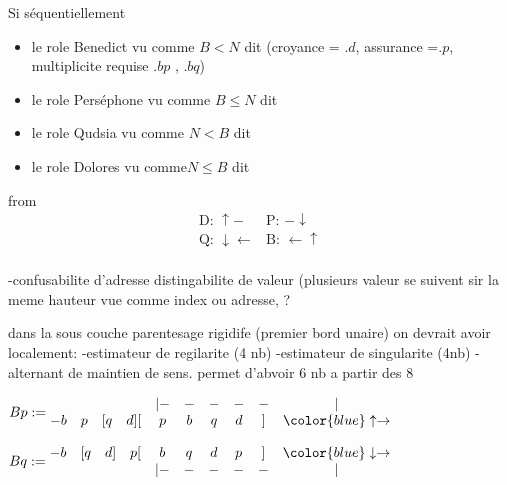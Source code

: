 \documentclass{article}
\newcommand{\blue}[1]{{\color{blue} #1}}
\begin{document}
Si séquentiellement 
\begin{itemize}
\item  le role  Benedict vu comme $B<N$  dit  (croyance = $.d$, assurance =$.p$, multiplicite requise $.bp$ , $.bq$)
\item le role  Perséphone vu comme $B\le N$  dit 
\item le role Qudsia vu comme $N<B$ dit 
\item le role  Dolores vu comme$ N\le B$ dit 
\end{itemize}



from
$$\begin{matrix}
\text{D: }\uparrow - &\text{P: } - \downarrow \\
\text{Q: }\downarrow \leftarrow  &\text{B: } \leftarrow \uparrow \\
\end{matrix}$$ 



 -confusabilite d'adresse   distingabilite  de valeur (plusieurs valeur se suivent sir la meme hauteur vue comme index ou adresse, ?

dans la sous couche parentesage rigidife (premier bord unaire) on devrait avoir localement:
-estimateur de regilarite (4 nb)
-estimateur de singularite (4nb)
-alternant de maintien de sens. permet d'abvoir 6 nb  a partir des 8


$Bp:= \begin{matrix} 
             &&&&|-&-&-&-&-&|\\
            - b&p&[q&d][&p&b&q&d&]&\blue{\uparrow \rightarrow}
\end{matrix}$


$Bq:= \begin{matrix} 
            - b&[q&d]&p[&b&q&d&p&]&\blue{\downarrow \rightarrow}\\
             &&&&|-&-&-&-&-&|
\end{matrix}$
\end{document}
